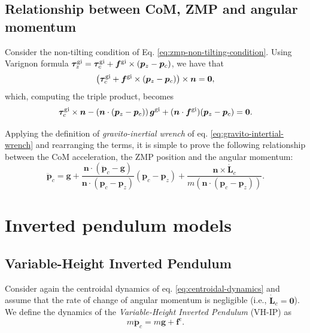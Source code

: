 \subsection{Relationship between CoM, ZMP and angular momentum}
Consider the non-tilting condition of Eq. \eqref{eq:zmp-non-tilting-condition}. Using Varignon formula $\bm{\tau}_z^{\rm gi} = \bm{\tau}_c^{\rm gi} + \bm{f}^{\rm gi} \times (\bm{p}_z - \bm{p}_c)$, we have that
\begin{equation}
    \left(\bm{\tau}_c^{\rm gi} + \bm{f}^{\rm gi} \times (\bm{p}_z - \bm{p}_c)\right) \times \bm{n} = \bm{0},
\end{equation}
which, computing the triple product, becomes
\begin{equation}
    \bm{\tau}_c^{\rm gi} \times \bm{n} - \left(\bm{n} \cdot (\bm{p}_z - \bm{p}_c)\right) \bm{g}^{\rm gi} + (\bm{n} \cdot \bm{f}^{\rm gi}) (\bm{p}_z - \bm{p}_c) = \bm{0}.
\end{equation}

Applying the definition of \textit{gravito-inertial wrench} of eq. \eqref{eq:gravito-intertial-wrench} and rearranging the terms, it is simple to prove \cite{Caron2017TRO} the following relationship between the CoM acceleration, the ZMP position and the angular momentum:
\begin{equation}
    \label{eq:relationship-com-zmp-angular-momentum}
    \ddot{\bm{p}}_c = \bm{g} + \frac{\bm{n} \cdot (\bm{\ddot{p}}_c - \bm{g})}{\bm{n} \cdot (\bm{p}_c - \bm{p}_z)} (\bm{p}_c - \bm{p}_z) + \frac{\bm{n} \times \bm{\dot{L}}_c}{m \left(\bm{n} \cdot (\bm{p}_c - \bm{p}_z)\right)}.
\end{equation}
\section{Inverted pendulum models}
\subsection{Variable-Height Inverted Pendulum}
Consider again the centroidal dynamics of eq. \eqref{eq:centroidal-dynamics}
and assume that the rate of change of angular momentum is negligible (i.e.,
$\dot{\bm{L}}_c=\bm{0}$). We define the dynamics of the \textit{Variable-Height
Inverted Pendulum} (VH-IP) \cite{Koolen2016VHIP, Caron2019CapturabilitybasedPatternGeneration} as
\begin{equation}
    \label{eq:VH-IP}
    m \ddot{\bm{p}}_c = m \bm{g} + \bm{f}^{\mathrm{c}}.
\end{equation}

